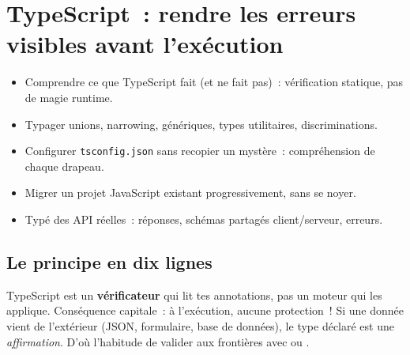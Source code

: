 \chapter{TypeScript~: rendre les erreurs visibles avant l'ex\'ecution}
\label{ch-js-ts}

\begin{objectif}
\begin{itemize}
  \item Comprendre ce que TypeScript fait (et ne fait pas)~: v\'erification statique, pas de magie runtime.
  \item Typager unions, narrowing, g\'en\'eriques, types utilitaires, discriminations.
  \item Configurer \texttt{tsconfig.json} sans recopier un myst\`ere~: compr\'ehension de chaque drapeau.
  \item Migrer un projet JavaScript existant progressivement, sans se noyer.
  \item Typ\'e des API r\'eelles~: r\'eponses, sch\'emas partag\'es client/serveur, erreurs.
\end{itemize}
\end{objectif}

\section{Le principe en dix lignes}


TypeScript est un \textbf{v\'erificateur} qui lit tes annotations, pas un moteur qui les applique.
Cons\'equence capitale~: \`a l'ex\'ecution, aucune protection~! Si une donn\'ee vient de l'ext\'erieur
(JSON, formulaire, base de donn\'ees), le type d\'eclar\'e est une \emph{affirmation}. D'o\`u l'habitude
de valider aux fronti\`eres avec  ou .


